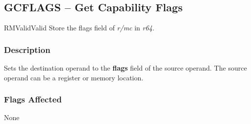 \clearpage
{}
{}
\subsection*{GCFLAGS -- Get Capability Flags}

\begin{x86opcodetable}
  {RM}{Valid}{Valid}
  {Store the flags field of \emph{r/mc} in \emph{r64}.}
\end{x86opcodetable}

\begin{x86opentable}
\end{x86opentable}

\subsubsection*{Description}

Sets the destination operand to the \textbf{flags} field of the source
operand.  The source operand can be a register or memory location.

\subsubsection*{Flags Affected}

None
